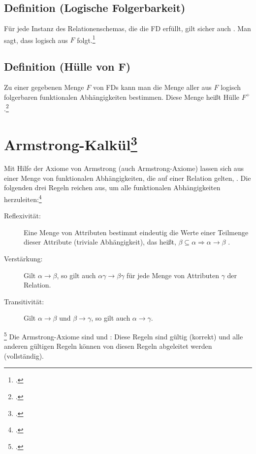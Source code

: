 \documentclass{lehramt-informatik-haupt}
\begin{document}
%

\subsection{Definition (Logische Folgerbarkeit)}

Für jede Instanz des Relationenschemas, die die FD  erfüllt, gilt sicher auch
. Man sagt, dass 
logisch aus $F$ folgt.\footcite[Seite 171]{winter}

%

\subsection{Definition (Hülle von F)}

Zu einer gegebenen Menge $F$ von FDs kann man die Menge aller aus $F$
logisch folgerbaren funktionalen Abhängigkeiten bestimmen. Diese Menge
heißt Hülle $F^+$.\footcite[Seite 171]{winter}

%

\section{Armstrong-Kalkül\footcite[Axiome von Armstrong]{wiki:funktionale-abhängigkeit}}

Mit Hilfe der Axiome von Armstrong (auch Armstrong-Axiome) lassen sich
aus einer Menge von funktionalen Abhängigkeiten, die auf einer Relation
gelten, .
Die folgenden drei Regeln reichen aus, um alle funktionalen
Abhängigkeiten herzuleiten:\footcite[Seite 14]{db:fs:4}

%


\begin{description}
\item[Reflexivität:]
%
Eine Menge von Attributen bestimmt eindeutig die Werte einer Teilmenge
dieser Attribute (triviale Abhängigkeit), das heißt,
$\beta \subseteq \alpha \Rightarrow \alpha \rightarrow \beta$ .

\item[Verstärkung:]
%
Gilt
$\alpha \rightarrow \beta$, so gilt auch
$\alpha \gamma \rightarrow \beta \gamma$
für jede Menge von Attributen
$\gamma$ der
Relation.

\item[Transitivität:]
%
Gilt
$\alpha \rightarrow \beta$
und
$\beta \rightarrow \gamma$,
so gilt auch
$\alpha \rightarrow \gamma$.
\end{description}
\footcite[Axiome von Armstrong]{wiki:funktionale-abhängigkeit}
Die Armstrong-Axiome sind  und : Diese
Regeln sind gültig (korrekt) und alle anderen gültigen Regeln können von
diesen Regeln abgeleitet werden (vollständig).
\end{document}
